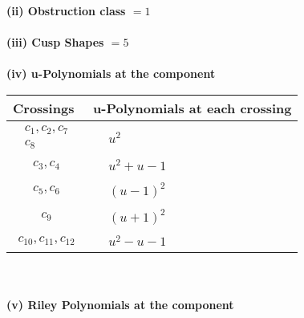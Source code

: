 \documentclass[1p]{elsarticle_modified}
\theoremstyle{definition}
\begin{document}
\flushleft \textbf{(ii) Obstruction class $= 1$}\\~\\
\flushleft \textbf{(iii) Cusp Shapes $= 5$}\\~\\
\newpage\renewcommand{\arraystretch}{1}
\flushleft \textbf{(iv) u-Polynomials at the component}\newline \\
\begin{tabular}{m{50pt}|m{274pt}}
Crossings & \hspace{64pt}u-Polynomials at each crossing \\
\hline $$\begin{aligned}c_{1},c_{2},c_{7}\\c_{8}\end{aligned}$$&$\begin{aligned}
&u^2
\end{aligned}$\\
\hline $$\begin{aligned}c_{3},c_{4}\end{aligned}$$&$\begin{aligned}
&u^2+u-1
\end{aligned}$\\
\hline $$\begin{aligned}c_{5},c_{6}\end{aligned}$$&$\begin{aligned}
&(u-1)^2
\end{aligned}$\\
\hline $$\begin{aligned}c_{9}\end{aligned}$$&$\begin{aligned}
&(u+1)^2
\end{aligned}$\\
\hline $$\begin{aligned}c_{10},c_{11},c_{12}\end{aligned}$$&$\begin{aligned}
&u^2- u-1
\end{aligned}$\\
\hline
\end{tabular}\\~\\
\newpage\renewcommand{\arraystretch}{1}
\flushleft \textbf{(v) Riley Polynomials at the component}\newline \\
\end{document}

